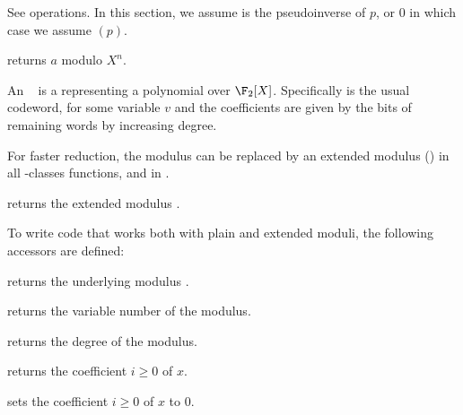  See  operations.
In this section, we assume  is the pseudoinverse of $p$, or $0$ in
which case we assume $(p)$.

 returns $a$ modulo $X^n$.









 An ~ is a 
representing a polynomial over $\F_2[X]$. Specifically
 is the usual codeword,  for some
variable $v$ and the coefficients are given by the bits of remaining
words by increasing degree.


For faster reduction, the modulus  can be replaced by an extended
modulus () in all -classes functions, and in
.

 returns the extended modulus .

To write code that works both with plain and extended moduli, the following
accessors are defined:

 returns the underlying modulus .

 returns the variable number of the modulus.

 returns the degree of the modulus.


 returns the coefficient $i\ge 0$ of $x$.

 sets the coefficient $i\ge 0$ of $x$ to
$0$.

